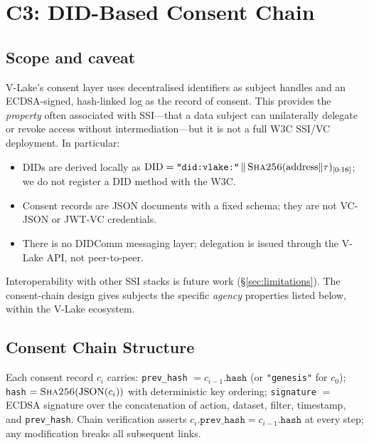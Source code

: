 \documentclass[10pt,twocolumn]{article}
\begin{document}
\section{C3: DID-Based Consent Chain}
\label{sec:ssi}

\subsection{Scope and caveat}

V-Lake's consent layer uses decentralised identifiers as subject
handles and an ECDSA-signed, hash-linked log as the record of
consent. This provides the \emph{property} often associated with
SSI---that a data subject can unilaterally delegate or revoke
access without intermediation---but it is not a full W3C
SSI/VC deployment. In particular:

\begin{itemize}[leftmargin=*,topsep=3pt,itemsep=2pt]
\item DIDs are derived locally as
  $\text{DID} = \texttt{"did:vlake:"} \,\|\, \textsc{Sha256}%
  (\text{address} \| \tau)_{[0{:}16]}$;
  we do not register a DID method with the W3C.
\item Consent records are JSON documents with a fixed schema; they
  are not VC-JSON or JWT-VC credentials.
\item There is no DIDComm messaging layer; delegation is issued
  through the V-Lake API, not peer-to-peer.
\end{itemize}

\noindent
Interoperability with other SSI stacks is future work
(\S\ref{sec:limitations}). The consent-chain design gives subjects
the specific \emph{agency} properties listed below, within the
V-Lake ecosystem.

\subsection{Consent Chain Structure}

Each consent record $c_i$ carries:
\texttt{prev\_hash} $= c_{i-1}.\texttt{hash}$
(or \texttt{"genesis"} for $c_0$);
\texttt{hash} $= \textsc{Sha256}(\text{JSON}(c_i))$ with
deterministic key ordering;
\texttt{signature} $=$ ECDSA signature over the concatenation of
action, dataset, filter, timestamp, and \texttt{prev\_hash}.
Chain verification asserts
$c_i.\texttt{prev\_hash} = c_{i-1}.\texttt{hash}$ at every step; any
modification breaks all subsequent links.
\end{document}
